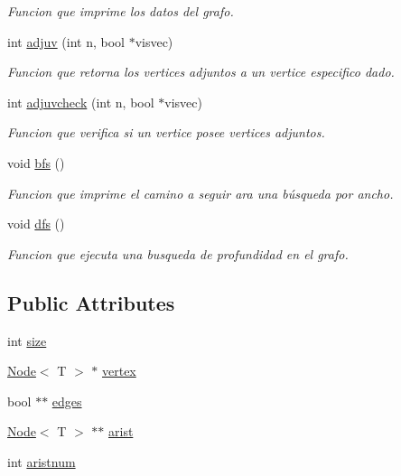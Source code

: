 \begin{DoxyCompactItemize}
\begin{DoxyCompactList}\small\item\em Funcion que imprime los datos del grafo. \end{DoxyCompactList}\item 
int \hyperlink{class_graph_af0776470865242ef040ecbb93226667f}{adjuv} (int n, bool $\ast$visvec)
\begin{DoxyCompactList}\small\item\em Funcion que retorna los vertices adjuntos a un vertice especifico dado. \end{DoxyCompactList}\item 
int \hyperlink{class_graph_a000c1e49d9bf261be1a4f4046a92e4cf}{adjuvcheck} (int n, bool $\ast$visvec)
\begin{DoxyCompactList}\small\item\em Funcion que verifica si un vertice posee vertices adjuntos. \end{DoxyCompactList}\item 
void \hyperlink{class_graph_a361095b62eb33806ed2df3608911c8c9}{bfs} ()
\begin{DoxyCompactList}\small\item\em Funcion que imprime el camino a seguir ara una búsqueda por ancho. \end{DoxyCompactList}\item 
void \hyperlink{class_graph_ae322c2f16b2dfd159e41ee7649899f0f}{dfs} ()
\begin{DoxyCompactList}\small\item\em Funcion que ejecuta una busqueda de profundidad en el grafo. \end{DoxyCompactList}\end{DoxyCompactItemize}
\subsection*{Public Attributes}
\begin{DoxyCompactItemize}
\item 
int \hyperlink{class_graph_a592a0bf5252e291cac9beddc3ef0dce4}{size}
\item 
\hyperlink{class_node}{Node}$<$ T $>$ $\ast$ \hyperlink{class_graph_a0f18c16458fe766ab6fff7c13b2c896e}{vertex}
\item 
bool $\ast$$\ast$ \hyperlink{class_graph_a984840929138988e3fb622fffc6b22d1}{edges}
\item 
\hyperlink{class_node}{Node}$<$ T $>$ $\ast$$\ast$ \hyperlink{class_graph_aa4d188bead6f84478f1f809c09529195}{arist}
\item 
int \hyperlink{class_graph_a5ac45f979baab5c953444780f03aca55}{aristnum}
\end{DoxyCompactItemize}


